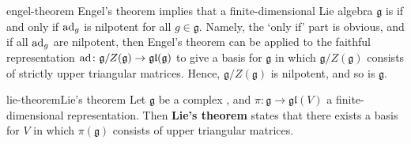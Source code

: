 \begin{example}{engel-theorem}
    Engel's theorem implies that a finite-dimensional Lie algebra $\mathfrak{g}$ is  if and only if $\textup{ad}_g$ is nilpotent for all $g \in \mathfrak{g}$. Namely, the `only if' part is obvious, and if all $\textup{ad}_g$ are nilpotent, then Engel's theorem can be applied to the faithful representation $\textup{ad} \colon \mathfrak{g}/Z(\mathfrak{g}) \to \mathfrak{gl}(\mathfrak{g})$ to give a basis for $\mathfrak{g}$ in which $\mathfrak{g}/Z(\mathfrak{g})$ consists of strictly upper triangular matrices. Hence, $\mathfrak{g}/Z(\mathfrak{g})$ is nilpotent, and so is $\mathfrak{g}$.
\end{example}

\begin{topic}{lie-theorem}{Lie's theorem}
    Let $\mathfrak{g}$ be a  complex , and $\pi \colon \mathfrak{g} \to \mathfrak{gl}(V)$ a finite-dimensional representation. Then \textbf{Lie's theorem} states that there exists a basis for $V$ in which $\pi(\mathfrak{g})$ consists of upper triangular matrices.
\end{topic}

